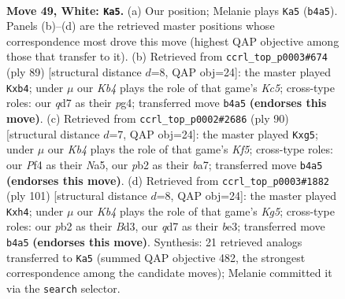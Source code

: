 \documentclass[11pt]{article}
\begin{document}
\clearpage

\begin{figure}[p]\centering
\begin{subfigure}{0.46\textwidth}\centering
\resizebox{\linewidth}{!}{%
\newchessgame
\chessboard[
  setfen={7k/3q4/8/8/1Kp2P2/2P5/1p6/8 w - - 0 49},
  showmover=false,
  pgfstyle=straightmove, color=movearrow, markmove={b4-a5}
]}
\caption{}
\end{subfigure}\hfill
\begin{subfigure}{0.46\textwidth}\centering
\resizebox{\linewidth}{!}{%
\newchessgame
\chessboard[
  setfen={8/8/7p/1p6/1Pk3P1/8/5P2/5K2 b - - 0 45},
  showmover=false,
  pgfstyle=straightmove, color=movearrow, markmove={c4-b4}
]}
\caption{}
\end{subfigure}
\\[4pt]
\begin{subfigure}{0.46\textwidth}\centering
\resizebox{\linewidth}{!}{%
\newchessgame
\chessboard[
  setfen={5k2/b7/8/N4Kp1/6P1/8/8/8 w - - 8 46},
  showmover=false,
  pgfstyle=straightmove, color=movearrow, markmove={f5-g5}
]}
\caption{}
\end{subfigure}\hfill
\begin{subfigure}{0.46\textwidth}\centering
\resizebox{\linewidth}{!}{%
\newchessgame
\chessboard[
  setfen={8/8/2K5/P3p2p/6kP/3bB3/8/8 b - - 0 51},
  showmover=false,
  pgfstyle=straightmove, color=movearrow, markmove={g4-h4}
]}
\caption{}
\end{subfigure}
\caption{\textbf{Move 49, White: \texttt{Ka5}.} (a) Our position; Melanie plays \texttt{Ka5} (\texttt{b4a5}). Panels (b)--(d) are the retrieved master positions whose correspondence most drove this move (highest QAP objective among those that transfer to it). (b) Retrieved from \texttt{ccrl\_top\_p0003\#674} (ply 89) [structural distance $d$=8, QAP obj=24]: the master played \texttt{Kxb4}; under $\mu$ our \emph{Kb4} plays the role of that game's \emph{Kc5}; cross-type roles: our \emph{q}d7 as their \emph{p}g4; transferred move \texttt{b4a5} \textbf{(endorses this move)}. (c) Retrieved from \texttt{ccrl\_top\_p0002\#2686} (ply 90) [structural distance $d$=7, QAP obj=24]: the master played \texttt{Kxg5}; under $\mu$ our \emph{Kb4} plays the role of that game's \emph{Kf5}; cross-type roles: our \emph{P}f4 as their \emph{N}a5, our \emph{p}b2 as their \emph{b}a7; transferred move \texttt{b4a5} \textbf{(endorses this move)}. (d) Retrieved from \texttt{ccrl\_top\_p0003\#1882} (ply 101) [structural distance $d$=8, QAP obj=24]: the master played \texttt{Kxh4}; under $\mu$ our \emph{Kb4} plays the role of that game's \emph{Kg5}; cross-type roles: our \emph{p}b2 as their \emph{B}d3, our \emph{q}d7 as their \emph{b}e3; transferred move \texttt{b4a5} \textbf{(endorses this move)}. Synthesis: 21 retrieved analogs transferred to \texttt{Ka5} (summed QAP objective 482, the strongest correspondence among the candidate moves); Melanie committed it via the \texttt{search} selector.}
\label{fig:thought-m96}
\end{figure}
\end{document}
